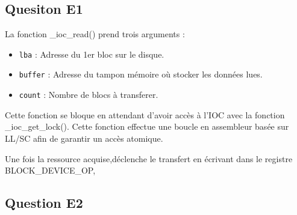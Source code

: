 \documentclass[10pt]{article}
\begin{document}
\subsection{Quesiton E1}
La fonction \_ioc\_read() prend trois arguments :
\begin{itemize}
  \item \texttt{lba} : Adresse du 1er bloc sur le disque.
  \item \texttt{buffer} : Adresse du tampon mémoire où stocker les données lues.
  \item \texttt{count} : Nombre de blocs à transferer.
\end{itemize}
Cette fonction se bloque en attendant d'avoir accès à l'IOC avec la fonction
\_ioc\_get\_lock(). Cette fonction effectue une boucle en assembleur basée sur
LL/SC afin de garantir un accès atomique.

Une fois la ressource acquise,déclenche le transfert en écrivant dans le
registre
BLOCK\_DEVICE\_OP,

\subsection{Question E2}
\end{document}
